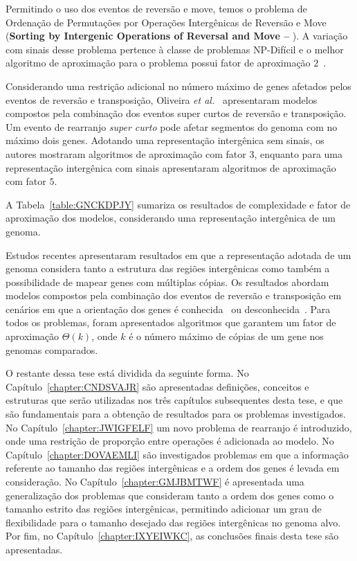 Permitindo o uso dos eventos de reversão e move, temos o problema de Ordenação de Permutações por Operações Intergênicas de Reversão e Move (\textbf{Sorting by Intergenic Operations of Reversal and Move --} \SbIRM). A variação com sinais desse problema pertence à classe de problemas NP-Difícil e o melhor algoritmo de aproximação para o problema possui fator de aproximação $2$~\cite{2022b-brito-etal}.

Considerando uma restrição adicional no número máximo de genes afetados pelos eventos de reversão e transposição, Oliveira \textit{et al.}~\cite{2019c-oliveira-etal} apresentaram modelos compostos pela combinação dos eventos super curtos de reversão e transposição. Um evento de rearranjo \emph{super curto} pode afetar segmentos do genoma com no máximo dois genes. Adotando uma representação intergênica sem sinais, os autores mostraram algoritmos de aproximação com fator $3$, enquanto para uma representação intergênica com sinais apresentaram algoritmos de aproximação com fator $5$.

A Tabela~\ref{table:GNCKDPJY} sumariza os resultados de complexidade e fator de aproximação dos modelos, considerando uma representação intergênica de um genoma.



Estudos recentes apresentaram resultados em que a representação adotada de um genoma considera tanto a estrutura das regiões intergênicas como também a possibilidade de mapear genes com múltiplas cópias. Os resultados abordam modelos compostos pela combinação dos eventos de reversão e transposição em cenários em que a orientação dos genes é conhecida~\cite{2022-siqueira-etal} ou desconhecida~\cite{2021b-siqueira-etal}. Para todos os problemas, foram apresentados algoritmos que garantem um fator de aproximação $\Theta(k)$, onde $k$ é o número máximo de cópias de um gene nos genomas comparados.

O restante dessa tese está dividida da seguinte forma. No Capítulo~\ref{chapter:CNDSVAJR} são apresentadas definições, conceitos e estruturas que serão utilizadas nos três capítulos subsequentes desta tese, e que são fundamentais para a obtenção de resultados para os problemas investigados. No Capítulo~\ref{chapter:JWIGFELF} um novo problema de rearranjo é introduzido, onde uma restrição de proporção entre operações é adicionada ao modelo. No Capítulo~\ref{chapter:DOVAEMLI} são investigados problemas em que a informação referente ao tamanho das regiões intergênicas e a ordem dos genes é levada em consideração. No Capítulo~\ref{chapter:GMJBMTWF} é apresentada uma generalização dos problemas que consideram tanto a ordem dos genes como o tamanho estrito das regiões intergênicas, permitindo adicionar um grau de flexibilidade para o tamanho desejado das regiões intergênicas no genoma alvo. Por fim, no Capítulo~\ref{chapter:IXYEIWKC}, as conclusões finais desta tese são apresentadas.

